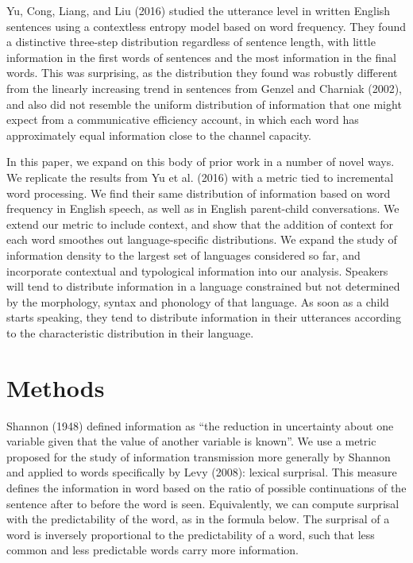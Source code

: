 \documentclass[man,floatsintext]{apa6}
\begin{document}
Yu, Cong, Liang, and Liu (2016) studied the utterance level in written English sentences using a contextless entropy model based on word frequency. They found a distinctive three-step distribution regardless of sentence length, with little information in the first words of sentences and the most information in the final words. This was surprising, as the distribution they found was robustly different from the linearly increasing trend in sentences from Genzel and Charniak (2002), and also did not resemble the uniform distribution of information that one might expect from a communicative efficiency account, in which each word has approximately equal information close to the channel capacity.

In this paper, we expand on this body of prior work in a number of novel ways. We replicate the results from Yu et al. (2016) with a metric tied to incremental word processing. We find their same distribution of information based on word frequency in English speech, as well as in English parent-child conversations. We extend our metric to include context, and show that the addition of context for each word smoothes out language-specific distributions. We expand the study of information density to the largest set of languages considered so far, and incorporate contextual and typological information into our analysis. Speakers will tend to distribute information in a language constrained but not determined by the morphology, syntax and phonology of that language. As soon as a child starts speaking, they tend to distribute information in their utterances according to the characteristic distribution in their language.

\hypertarget{methods}{%
\section{Methods}\label{methods}}

Shannon (1948) defined information as \enquote{the reduction in uncertainty about one variable given that the value of another variable is known}. We use a metric proposed for the study of information transmission more generally by Shannon and applied to words specifically by Levy (2008): lexical surprisal. This measure defines the information in word based on the ratio of possible continuations of the sentence after to before the word is seen. Equivalently, we can compute surprisal with the predictability of the word, as in the formula below. The surprisal of a word is inversely proportional to the predictability of a word, such that less common and less predictable words carry more information.
\end{document}
